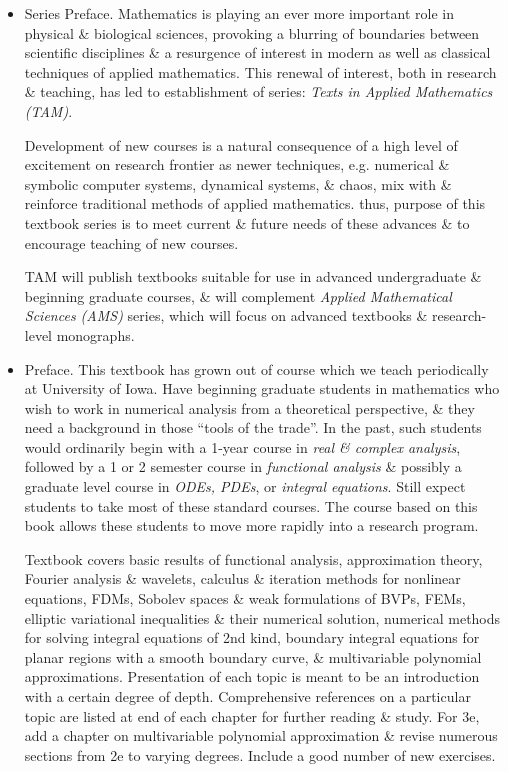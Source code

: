 \documentclass{article}
\begin{document}
\begin{itemize}
	\item {\sf Series Preface.} Mathematics is playing an ever more important role in physical \& biological sciences, provoking a blurring of boundaries between scientific disciplines \& a resurgence of interest in modern as well as classical techniques of applied mathematics. This renewal of interest, both in research \& teaching, has led to establishment of series: {\it Texts in Applied Mathematics (TAM)}.
	
	Development of new courses is a natural consequence of a high level of excitement on research frontier as newer techniques, e.g. numerical \& symbolic computer systems, dynamical systems, \& chaos, mix with \& reinforce traditional methods of applied mathematics. thus, purpose of this textbook series is to meet current \& future needs of these advances \& to encourage teaching of new courses.
	
	TAM will publish textbooks suitable for use in advanced undergraduate \& beginning graduate courses, \& will complement {\it Applied Mathematical Sciences (AMS)} series, which will focus on advanced textbooks \& research-level monographs.
	\item {\sf Preface.} This textbook has grown out of course which we teach periodically at University of Iowa. Have beginning graduate students in mathematics who wish to work in numerical analysis from a theoretical perspective, \& they need a background in those ``tools of the trade''. In the past, such students would ordinarily begin with a 1-year course in {\it real \& complex analysis}, followed by a 1 or 2 semester course in {\it functional analysis} \& possibly a graduate  level course in {\it ODEs, PDEs}, or {\it integral equations}. Still expect students to take most of these standard courses. The course based on this book allows these students to move more rapidly into a research program.
	
	Textbook covers basic results of functional analysis, approximation theory, Fourier analysis \& wavelets, calculus \& iteration methods for nonlinear equations, FDMs, Sobolev spaces \& weak formulations of BVPs, FEMs, elliptic variational inequalities \& their numerical solution, numerical methods for solving integral equations of 2nd kind, boundary integral equations for planar regions with a smooth boundary curve, \& multivariable polynomial approximations. Presentation of each topic is meant to be an introduction with a certain degree of depth. Comprehensive references on a particular topic are listed at end of each chapter for further reading \& study. For 3e, add a chapter on multivariable polynomial approximation \& revise numerous sections from 2e to varying degrees. Include a good number of new exercises.
	

\end{itemize}
\end{document}
